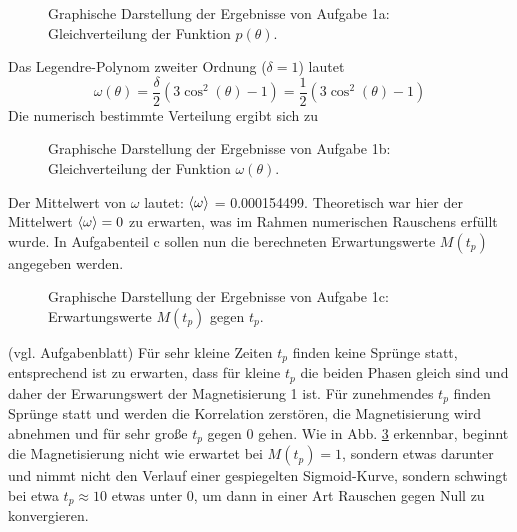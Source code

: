 \begin{landscape}
	\begin{figure}
		\caption{Graphische Darstellung der Ergebnisse von Aufgabe 1a: Gleichverteilung der Funktion $p(\theta)$.}
		\label{fig:1a}
	\end{figure}
\end{landscape}
Das Legendre-Polynom zweiter Ordnung ($\delta = 1$) lautet
\begin{equation}
	\omega(\theta) = \frac{\delta}{2} (3\cos^2(\theta)-1) = \frac{1}{2} (3\cos^2(\theta)-1)
\end{equation}
Die numerisch bestimmte Verteilung ergibt sich zu
\begin{landscape}
	\begin{figure}
		\caption{Graphische Darstellung der Ergebnisse von Aufgabe 1b: Gleichverteilung der Funktion $\omega(\theta)$.}
		\label{fig:1b}
	\end{figure}
\end{landscape}
Der Mittelwert von $\omega$ lautet: $\braket{\omega}$ = 0.000154499. Theoretisch war hier der Mittelwert $\braket{\omega} = 0$ zu erwarten, was im Rahmen numerischen Rauschens erfüllt wurde.
In Aufgabenteil c sollen nun die berechneten Erwartungswerte $M(t_p)$ angegeben werden.
\begin{landscape}
	\begin{figure}
		\caption{Graphische Darstellung der Ergebnisse von Aufgabe 1c: Erwartungswerte $M(t_p)$ gegen $t_p$.}
		\label{fig:1c}
	\end{figure}
\end{landscape}
(vgl. Aufgabenblatt) Für sehr kleine Zeiten $t_p$ finden keine Sprünge statt, entsprechend ist zu erwarten,
dass für kleine $t_p$ die beiden Phasen gleich sind und daher der Erwarungswert der Magnetisierung 1 ist. Für zunehmendes $t_p$ finden Sprünge statt und werden die Korrelation zerstören, die Magnetisierung wird abnehmen und für sehr große $t_p$ gegen 0 gehen. Wie in Abb. \ref{fig:1c} erkennbar, beginnt die Magnetisierung nicht wie erwartet bei $M(t_p) = 1$, sondern etwas darunter und nimmt nicht den Verlauf einer gespiegelten Sigmoid-Kurve, sondern schwingt bei etwa $t_p \approx 10$ etwas unter 0, um dann in einer Art Rauschen gegen Null zu konvergieren.
